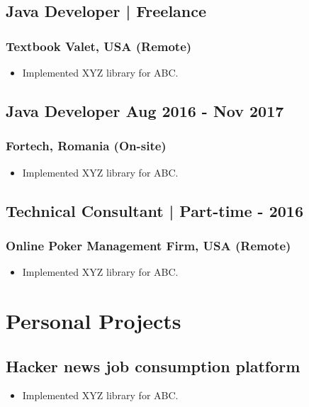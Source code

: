 \documentclass[11pt]{article}
\begin{document}
    \subsection{Java Developer | Freelance \hfill {}}
    \subsubsection{Textbook Valet, USA (Remote)}
    \begin{itemize}
        \item[\checkmark]  Implemented XYZ library for ABC.
    \end{itemize}
    
    \subsection{Java Developer \hfill \normalfont Aug 2016 - Nov 2017}
    \subsubsection{Fortech, Romania (On-site)}
    \begin{itemize}
        \item[\checkmark]  Implemented XYZ library for ABC.
    \end{itemize}
    
    \subsection{Technical Consultant | Part-time \hfill {} - 2016}
    \subsubsection{Online Poker Management Firm, USA (Remote)}
    \begin{itemize}
        \item[\checkmark]  Implemented XYZ library for ABC.
    \end{itemize}

    \section{Personal Projects}

    \subsection{Hacker news job consumption platform}
    \begin{itemize}
        \item[\checkmark] Implemented XYZ library for ABC.
    \end{itemize}
\end{document}
